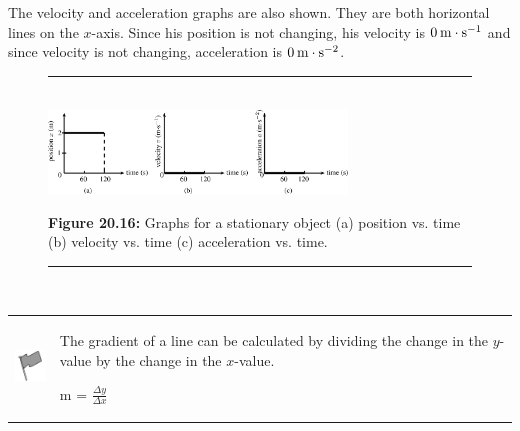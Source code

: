 The velocity and acceleration graphs are also shown. They are both horizontal lines on the $x$-axis. Since his position is not changing, his velocity is $0\phantom{\rule{2pt}{0ex}}\mathrm{m}\ensuremath{\cdot}\mathrm{s}{}^{-1}$ and since velocity is not changing, acceleration is $0\phantom{\rule{2pt}{0ex}}\mathrm{m}\ensuremath{\cdot}\mathrm{s}{}^{-2}$.\par 
    \setcounter{subfigure}{0}
	\begin{figure}[H] %
    \begin{center}
    \rule[.1in]{\figurerulewidth}{.005in} \\
        \label{m38795*uid89!!!underscore!!!media}\label{m38795*uid89!!!underscore!!!printimage}\includegraphics[width=300px]{col11305.imgs/m38795_PG10C2_021.png} %
      \vspace{2pt}
    \vspace{\rubberspace}\par \begin{cnxcaption}
	  \small \textbf{Figure 20.16: }Graphs for a stationary object (a) position vs. time (b) velocity vs. time (c) acceleration vs. time.
	\end{cnxcaption}
    \vspace{.1in}
    \rule[.1in]{\figurerulewidth}{.005in} \\
    \end{center}
 \end{figure}       
\par
            \label{m38795*fhsst!!!underscore!!!id1865}\begin{definition}
	  \begin{tabular*}{15 cm}{m{15 mm}m{}}
	\hspace*{-50pt}  \includegraphics[width=0.5in]{col11305.imgs/psflag2.png}   & \Definition{   \label{id2533985}\textbf{ Gradient }} { \label{m38795*meaningfhsst!!!underscore!!!id1865}
        \label{m38795*id69226}The gradient of a line can be calculated by dividing the change in the $y$-value by the change in the $x$-value.\par 
        \label{m38795*id69250}m = $\frac{\Delta y}{\Delta x}$ \par 
         } 
      \end{tabular*}
      \end{definition}
